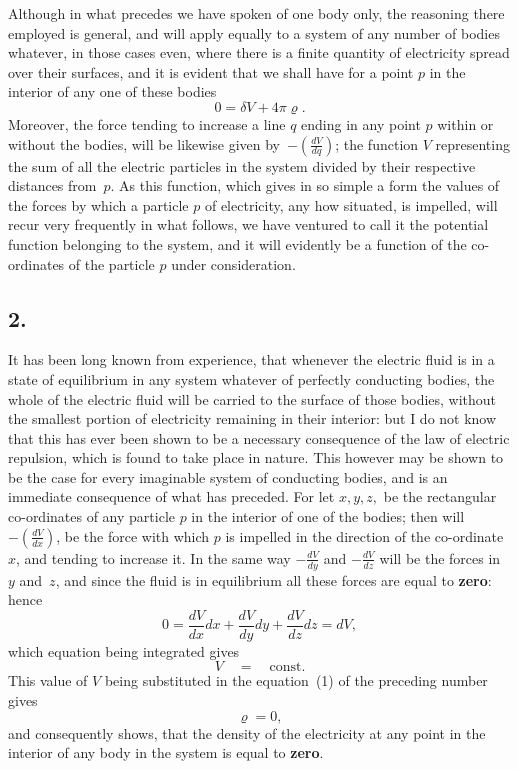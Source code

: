 \documentclass[12pt,notitlepage]{amsart}
\let\Emphasis\textbf
\newcommand\Section[1]{\subsection{{#1}}}
\renewcommand{\rho}{\varrho}
\begin{document}
Although in what precedes we have spoken of one body only, the
reasoning there employed is general, and will apply equally to a system of
any number of bodies whatever, in those cases even, where there is a finite
quantity of electricity spread over their surfaces, and it is evident that we
shall have for a point $p$ in the interior of any one of these bodies
\[
\tag{1.}
0=\delta V+4\pi\rho.
\]
Moreover, the force tending to increase a line $q$
ending in any point $p$ within
or without the bodies, will be likewise given
by~$-(\frac{dV}{dq})$; the function $V$
representing the sum of all the electric particles in the system divided by
their respective distances from~$p$. As this function, which gives in so simple
a form the values of the forces by which a particle $p$ of electricity, any how
situated, is impelled, will recur very frequently in what follows, we have
ventured to call it the potential function belonging to the system, and it will
evidently be a function of the co-ordinates of the particle $p$ under consideration.
\bigskip

\Section{2.}
It has been long known from experience, that whenever the electric
fluid is in a state of equilibrium in any system whatever of perfectly 
conducting bodies, the whole of the electric fluid
will be carried to the surface
of those bodies, without the smallest portion of electricity remaining in their
interior: but I do not know that this has ever been shown to be a necessary
consequence of the law of electric repulsion, which is found to take place in
nature. This however may be shown to be the case for every imaginable
system of conducting bodies, and is an immediate consequence of what has
preceded. For let $x,y,z,$ be the rectangular co-ordinates of any particle $p$
in the interior of one of the bodies; then will
$-(\frac{dV}{dx})$, be the force with
which $p$ is impelled in the direction of the co-ordinate~$x$,
and tending to
increase it. In the same way $-\frac{dV}{dy}$ and $-\frac{dV}{dz}$
will be the forces in~$y$ and~$z$,
and since the fluid is in equilibrium all these forces are equal to
\Emphasis{zero}: hence
\[
0=\frac{dV}{dx}dx+\frac{dV}{dy}dy+\frac{dV}{dz}dz=dV,
\]
which equation being integrated gives
\[
V \quad=\quad \text{const.}
\]
This value of $V$ being substituted in the equation~(1) of the preceding
number gives
\[
\rho = 0,
\]
and consequently shows, that the density of the electricity at any point in the
interior of any body in the system is equal to \Emphasis{zero}.
\end{document}
